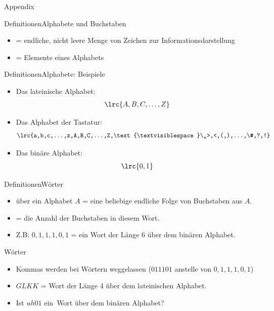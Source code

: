 \begin{frame}{Appendix}
\end{frame}

\begin{frame}{Definitionen}{Alphabete und Buchstaben}
\begin{itemize}[<+->]
\item {} = endliche, nicht leere
Menge von Zeichen zur Informationsdarstellung
\item {} = Elemente eines Alphabets
\end{itemize}
\end{frame}


\begin{frame}{Definitionen}{Alphabete: Beispiele}
\begin{itemize}[<+->]
\item
Das lateinische Alphabet:
\begin{align*}
    \lrc{A,B,C,\dots, Z}
\end{align*}
\item
Das Alphabet der Tastatur:
\begin{align*}
    \lrc{a,b,c,...,z,A,B,C,...,Z,\text{\textvisiblespace}\,,>,<,(,),...,\#,?,!}
\end{align*}
\item Das binäre Alphabet:
\begin{align*}
    \lrc{0,1}
\end{align*}

\end{itemize}
\end{frame}

\begin{frame}{Definitionen}{Wörter}
\begin{itemize}[<+->]
    \item {} über ein Alphabet $A$ = eine beliebige endliche Folge von Buchstaben aus $A$. 
    \item {} = die Anzahl der Buchstaben in diesem Wort.
    \item Z.B: $0,1,1,1,0,1$ = ein Wort der Länge 6 über dem binären Alphabet.
\end{itemize}
\end{frame}

\begin{frame}{Wörter}
\begin{itemize}[<+->]
    \item Kommas werden bei Wörtern weggelassen ($011101$ anstelle von $0,1,1,1,0,1$)
    \item $GLKK$ = Wort der Länge 4 über dem lateinischen Alphabet.
    \item Ist $uh01$ ein Wort über dem binären Alphabet?
\end{itemize}
\end{frame}